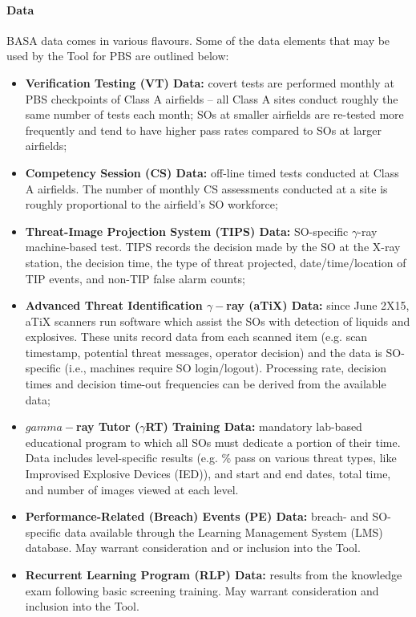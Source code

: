\paragraph{Data}
BASA data comes in various flavours. Some of the data elements that may be used by the Tool for PBS are outlined below:
\begin{itemize}[noitemsep]
\item \textbf{Verification Testing (VT) Data:} covert tests are performed monthly at PBS checkpoints of Class A airfields -- all Class A sites conduct roughly the same number of tests each month; SOs at smaller airfields are re-tested more frequently and tend to have higher pass rates compared to SOs at larger airfields;
\item \textbf{Competency Session (CS) Data:} off-line timed tests conducted at Class A airfields. The number of monthly CS assessments conducted at a site is roughly proportional to the airfield's SO workforce;
\item \textbf{Threat-Image Projection System (TIPS) Data:} SO-specific $\gamma$-ray machine-based test. TIPS records the decision made by the SO at the X-ray station, the decision time, the type of threat projected, date/time/location of TIP events, and non-TIP false alarm counts;
\item \textbf{Advanced Threat Identification $\gamma-$ray (aTiX) Data:} since June 2X15, aTiX scanners run software which assist the SOs with detection of liquids and explosives. These units record data from each scanned item (e.g. scan timestamp, potential threat messages, operator decision) and the data is SO-specific (i.e., machines require SO login/logout). Processing rate, decision times and decision time-out frequencies can be derived from the available data; 
\item \textbf{$gamma-$ray Tutor ($\gamma$RT) Training Data:} mandatory lab-based educational program to which all SOs must dedicate a portion of their time. Data includes level-specific results (e.g. \% pass on various threat types, like Improvised Explosive Devices (IED)), and start and end dates, total time, and number of images viewed at each level.
\item \textbf{Performance-Related (Breach) Events (PE) Data:} breach- and SO-specific data available through the Learning Management System (LMS) database. May warrant consideration and or inclusion into the Tool.
\item \textbf{Recurrent Learning Program (RLP) Data:} results from the knowledge exam following basic screening training. May warrant consideration and inclusion into the Tool.

\end{itemize}
